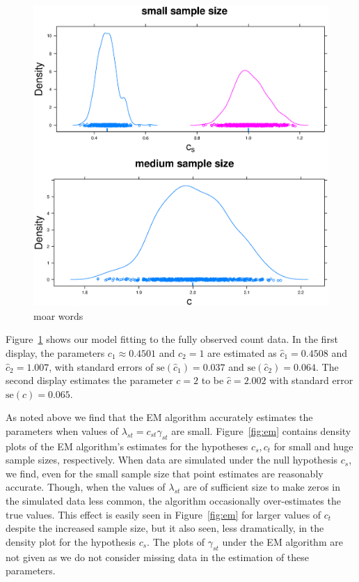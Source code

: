 \begin{figure}
  \centering
  \includegraphics[scale=0.5]{nonem}
  \caption{moar words}
  \label{fig:nonem}
\end{figure}

Figure~\ref{fig:nonem} shows our model fitting to the fully observed count data.  In the first display, the parameters $c_1 \approx 0.4501$ and $c_2 = 1$ are estimated as $\hat{c}_1 = 0.4508$ and $\hat{c}_2 = 1.007$, with standard errors of $\text{se}(\hat{c}_1) = 0.037$ and $\text{se}(\hat{c}_2) = 0.064$.  The second display estimates the parameter $c = 2$ to be $\hat{c} = 2.002$ with standard error $\text{se}(\hat{c}) = 0.065$.  

As noted above we find that the EM algorithm accurately estimates the parameters when values of $\lambda_{st} = c_{st}\gamma_{st}$ are small.  Figure~\ref{fig:em} contains density plots of the EM algorithm's estimates for the hypotheses $c_s,c_t$ for small and huge sample sizes, respectively.  When data are simulated under the null hypothesis $c_s$, we find, even for the small sample size that point estimates are reasonably accurate.  Though, when the values of $\lambda_{st}$ are of sufficient size to make zeros in the simulated data less common, the algorithm occasionally over-estimates the true values.  This effect is easily seen in Figure~\ref{fig:em} for larger values of $c_t$ despite the increased sample size, but it also seen, less dramatically, in the density plot for the hypothesis $c_s$.  The plots of $\gamma_{st}$ under the EM algorithm are not given as we do not consider missing data in the estimation of these parameters. 

